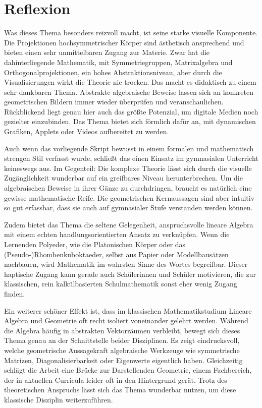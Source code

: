 \section{Reflexion}

Was dieses Thema besonders reizvoll macht, ist seine starke visuelle Komponente. Die Projektionen hochsymmetrischer Körper sind ästhetisch ansprechend und bieten einen sehr unmittelbaren Zugang zur Materie. Zwar hat die dahinterliegende Mathematik, mit Symmetriegruppen, Matrixalgebra und Orthogonalprojektionen, ein hohes Abstraktionsniveau, aber durch die Visualisierungen wirkt die Theorie nie trocken. Das macht es didaktisch zu einem sehr dankbaren Thema. Abstrakte algebraische Beweise lassen sich an konkreten geometrischen Bildern immer wieder überprüfen und veranschaulichen. Rückblickend liegt genau hier auch das größte Potenzial, um digitale Medien noch gezielter einzubinden. Das Thema bietet sich förmlich dafür an, mit dynamischen Grafiken, Applets oder Videos aufbereitet zu werden.

Auch wenn das vorliegende Skript bewusst in einem formalen und mathematisch strengen Stil verfasst wurde, schließt das einen Einsatz im gymnasialen Unterricht keineswegs aus. Im Gegenteil: Die komplexe Theorie lässt sich durch die visuelle Zugänglichkeit wunderbar auf ein greifbares Niveau herunterbrechen. Um die algebraischen Beweise in ihrer Gänze zu durchdringen, braucht es natürlich eine gewisse mathematische Reife. Die geometrischen Kernaussagen sind aber intuitiv so gut erfassbar, dass sie auch auf gymnasialer Stufe verstanden werden können.

Zudem bietet das Thema die seltene Gelegenheit, anspruchsvolle lineare Algebra mit einem echten handlungsorientierten Ansatz zu verknüpfen. Wenn die Lernenden Polyeder, wie die Platonischen Körper oder das (Pseudo-)Rhombenkuboktaeder, selbst aus Papier oder Modellbausätzen nachbauen, wird Mathematik im wahrsten Sinne des Wortes begreifbar. Dieser haptische Zugang kann gerade auch Schülerinnen und Schüler motivieren, die zur klassischen, rein kalkülbasierten Schulmathematik sonst eher wenig Zugang finden.

Ein weiterer schöner Effekt ist, dass im klassischen Mathematikstudium Lineare Algebra und Geometrie oft recht isoliert voneinander gelehrt werden. Während die Algebra häufig in abstrakten Vektorräumen verbleibt, bewegt sich dieses Thema genau an der Schnittstelle beider Disziplinen. Es zeigt eindrucksvoll, welche geometrische Aussagekraft algebraische Werkzeuge wie symmetrische Matrizen, Diagonalisierbarkeit oder Eigenwerte eigentlich haben. Gleichzeitig schlägt die Arbeit eine Brücke zur Darstellenden Geometrie, einem Fachbereich, der in aktuellen Curricula leider oft in den Hintergrund gerät. Trotz des theoretischen Anspruchs lässt sich das Thema wunderbar nutzen, um diese klassische Disziplin  weiterzuführen.

